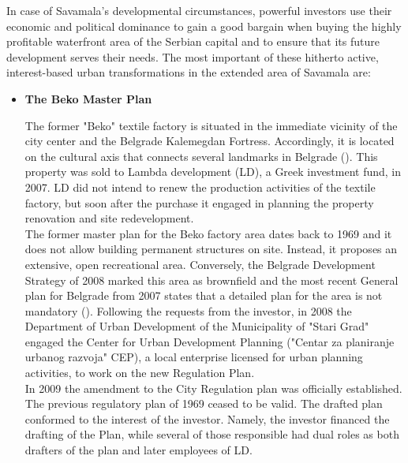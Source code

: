 \documentclass[11pt]{report}
\begin{document}
{{{{In case of Savamala’s developmental circumstances, powerful investors use their economic and political dominance to gain a good bargain when buying the highly profitable waterfront area of the Serbian capital and to ensure that its future development serves their needs. The most important of these hitherto active, interest-based urban transformations in the extended area of Savamala are:

\begin{itemize}
\item \textbf{The Beko Master Plan}

The former "Beko" textile factory is situated in the immediate vicinity of the city center and the Belgrade Kalemegdan Fortress. Accordingly, it is located on the cultural axis that connects several landmarks in Belgrade (\href{Vukmirovic}{\citealt{doytchinov_belgrade:_2015}}). 
This property was sold to Lambda development (LD), a Greek investment fund, in 2007. LD did not intend to renew the production activities of the textile factory, but  soon after the purchase it engaged in planning the property renovation and site redevelopment. 
\\

The former master plan for the Beko factory area dates back to 1969 and it does not allow building permanent structures on site. Instead, it proposes an extensive, open recreational area.
Conversely, the Belgrade Development Strategy of 2008 marked this area as brownfield and the most recent General plan for Belgrade from 2007 states that a detailed plan for the area is not mandatory (\href{Vukmirovic}{\citealt{doytchinov_belgrade:_2015}}).
Following the requests from the investor, in 2008 the Department of Urban Development of the Municipality of "Stari Grad" engaged the Center for Urban Development Planning ("Centar za planiranje urbanog razvoja" CEP), a local enterprise licensed for urban planning activities, to work on the new Regulation Plan.
\\

In 2009 the amendment to the City Regulation plan was officially established. The previous regulatory plan of 1969 ceased to be valid. The drafted plan conformed to the interest of the investor. Namely, the investor financed the drafting of the Plan, while several of those responsible had dual roles as both drafters of the plan and later employees of LD.
\\


\end{itemize}}}}}
\end{document}
